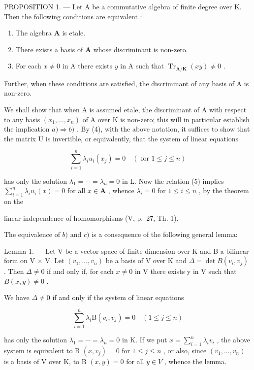 PROPOSITION 1. --- Let A be a commutative algebra of finite degree over K. Then the following conditions are equivalent :

\begin{enumerate}
\def\labelenumi{\alph{enumi})}
\item
  The algebra \(\mathbf{A}\) is etale.
\item
  There exists a basis of \(\mathbf{A}\) whose discriminant is non-zero.
\item
  For each \(x \neq 0\) in A there exists \(y\) in A such that \(\operatorname{Tr}_{\mathbf{A} / \mathbf{K}}(xy) \neq 0\) .
\end{enumerate}

Further, when these conditions are satisfied, the discriminant of any basis of A is non-zero.

We shall show that when A is assumed etale, the discriminant of A with respect to any basis \((x_{1},\ldots,x_{n})\) of A over K is non-zero; this will in particular establish the implication \(a)\Rightarrow b)\) . By (4), with the above notation, it suffices to show that the matrix U is invertible, or equivalently, that the system of linear equations

\[
\sum_ {i = 1} ^ {n} \lambda_ {i} u _ {i} (x _ {j}) = 0 \quad (\text { for } 1 \leqslant j \leqslant n)\tag{5}
\]

has only the solution \(\lambda_{1} = \cdots = \lambda_{n} = 0\) in L. Now the relation (5) implies \(\sum_{i=1}^{n} \lambda_{i} u_{i}(x) = 0\) for all \(x \in \mathbf{A}\) , whence \(\lambda_{i} = 0\) for \(1 \leqslant i \leqslant n\) , by the theorem on the

linear independence of homomorphisms (V, p.~27, Th. 1).

The equivalence of \(b)\) and \(c)\) is a consequence of the following general lemma:

Lemma 1. --- Let V be a vector space of finite dimension over K and B a bilinear form on V × V. Let \((v_{1}, \ldots, v_{n})\) be a basis of V over K and \(\Delta = \det B(v_{i}, v_{j})\) . Then \(\Delta \neq 0\) if and only if, for each \(x \neq 0\) in V there exists y in V such that \(B(x, y) \neq 0\) .

We have \(\Delta \neq 0\) if and only if the system of linear equations

\[
\sum_ {i = 1} ^ {n} \lambda_ {i} \mathrm{B} (v _ {i}, v _ {j}) = 0 \quad (1 \leqslant j \leqslant n)
\]

has only the solution \(\lambda_1 = \cdots = \lambda_n = 0\) in K. If we put \(x = \sum_{i=1}^{n} \lambda_i v_i\) , the above system is equivalent to B \((x, v_j) = 0\) for \(1 \leqslant j \leqslant n\) , or also, since \((v_1, \ldots, v_n)\) is a basis of V over K, to B \((x, y) = 0\) for all \(y \in V\) , whence the lemma.

